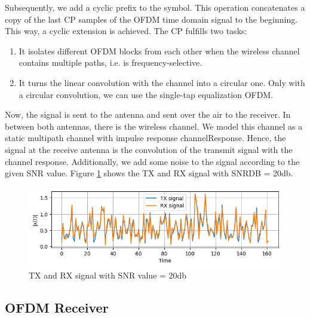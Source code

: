 Subsequently, we add a cyclic prefix to the symbol. This operation concatenates a copy of the last CP samples of the OFDM time domain signal to the beginning. This way, a cyclic extension is achieved. The CP fulfills two tasks:
\begin{enumerate}
    \item It isolates different OFDM blocks from each other when the wireless channel contains multiple paths, i.e. is frequency-selective.
    \item It turns the linear convolution with the channel into a circular one. Only with a circular convolution, we can use the single-tap equalization OFDM.
\end{enumerate}


Now, the signal is sent to the antenna and sent over the air to the receiver. In between both antennas, there is the wireless channel. We model this channel as a static multipath channel with impulse response channelResponse. Hence, the signal at the receive antenna is the convolution of the transmit signal with the channel response. Additionally, we add some noise to the signal according to the given SNR value. Figure \ref{tx_rx} shows the TX and RX signal with SNRDB = 20db.

\begin{figure}[htbp]
    \centering
    \includegraphics[width=\textwidth]{../Source/results/tx_rx}
    \caption{TX and RX signal with SNR value = 20db}
    \label{tx_rx}
\end{figure}

\subsection{OFDM Receiver}

